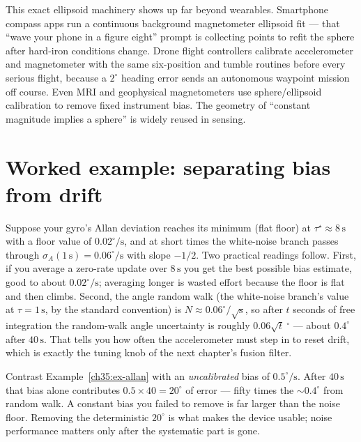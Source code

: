 \begin{applicationbox}
This exact ellipsoid machinery shows up far beyond wearables. Smartphone compass
apps run a continuous background magnetometer ellipsoid fit --- that ``wave your
phone in a figure eight'' prompt is collecting points to refit the sphere after
hard-iron conditions change. Drone flight controllers calibrate accelerometer
and magnetometer with the same six-position and tumble routines before every
serious flight, because a $2^\circ$ heading error sends an autonomous waypoint
mission off course. Even MRI and geophysical magnetometers use sphere/ellipsoid
calibration to remove fixed instrument bias. The geometry of ``constant magnitude
implies a sphere'' is widely reused in sensing.
\end{applicationbox}

\section{Worked example: separating bias from drift}
\label{ch35:worked}

\begin{example}
\label{ch35:ex-allan}
Suppose your gyro's Allan deviation reaches its minimum (flat floor) at
$\tau^\star \approx 8\,\mathrm{s}$ with a floor value of $0.02^\circ/\mathrm{s}$,
and at short times the white-noise branch passes through
$\sigma_A(1\,\mathrm{s}) = 0.06^\circ/\mathrm{s}$ with slope $-1/2$. Two practical
readings follow. First, if you average a zero-rate update over $8\,\mathrm{s}$ you
get the best possible bias estimate, good to about $0.02^\circ/\mathrm{s}$;
averaging longer is wasted effort because the floor is flat and then climbs.
Second, the angle random walk (the white-noise branch's value at
$\tau=1\,\mathrm{s}$, by the standard convention) is
$N \approx 0.06^\circ/\sqrt{\mathrm{s}}$, so after $t$ seconds of free
integration the random-walk angle uncertainty is roughly
$0.06\sqrt{t}\ ^\circ$ --- about $0.4^\circ$ after $40\,\mathrm{s}$. That tells
you how often the accelerometer must step in to reset drift, which is exactly the
tuning knob of the next chapter's fusion filter.
\end{example}

\begin{example}
\label{ch35:ex-bias-vs-walk}
Contrast Example~\ref{ch35:ex-allan} with an \emph{uncalibrated} bias of
$0.5^\circ/\mathrm{s}$. After $40\,\mathrm{s}$ that bias alone contributes
$0.5\times40 = 20^\circ$ of error --- fifty times the $\sim 0.4^\circ$ from random
walk. A constant bias you failed to remove is far larger than the noise floor.
Removing the deterministic $20^\circ$ is what makes the device usable; noise
performance matters only after the systematic part is gone.
\end{example}

